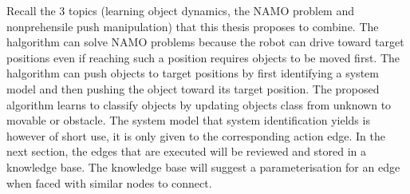 Recall the 3 topics (learning object dynamics, the \ac{NAMO} problem and nonprehensile push manipulation) that this thesis proposes to combine. The \ac{halgorithm} can solve \ac{NAMO} problems because the robot can drive toward target positions even if reaching such a position requires objects to be moved first. The \ac{halgorithm} can push objects to target positions by first identifying a system model and then pushing the object toward its target position. The proposed algorithm learns to classify objects by updating objects class from unknown to movable or obstacle. The system model that system identification yields is however of short use, it is only given to the corresponding action edge. In the next section, the edges that are executed will be reviewed and stored in a knowledge base. The knowledge base will suggest a parameterisation for an edge when faced with similar nodes to connect. 
